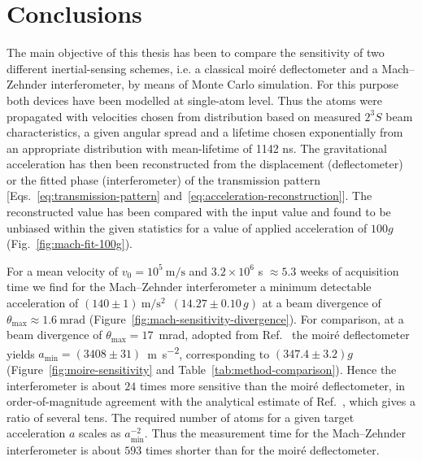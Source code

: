 \documentclass[12pt]{report}
\begin{document}
\chapter{Conclusions}
The main objective of this thesis has been to compare the sensitivity of two different inertial-sensing schemes, i.e. a classical moir\'e deflectometer and a Mach--Zehnder interferometer, by means of Monte Carlo simulation. For this purpose both devices have been modelled at single-atom level. Thus the atoms were propagated with velocities chosen from distribution based on measured $2^3S$ beam characteristics, a given angular spread and a lifetime chosen exponentially from an appropriate distribution with mean-lifetime of 1142 ns. 
The gravitational acceleration has then been reconstructed from the displacement (deflectometer) or the fitted phase (interferometer) of the transmission pattern [Eqs.~\eqref{eq:transmission-pattern} and~\eqref{eq:acceleration-reconstruction}]. The reconstructed value has been compared with the input value and found to be unbiased within the given statistics for a value of applied acceleration of $100g$ (Fig.~\ref{fig:mach-fit-100g}).

For a mean velocity of $v_0 = 10^5~\mathrm{m/s}$ and $3.2\times10^6$ s $\approx5.3$ weeks of acquisition time we find for the Mach--Zehnder interferometer a minimum detectable acceleration of $(140 \pm 1)~\mathrm{m/s^2}$ $\,(14.27 \pm 0.10\,g)$ at a beam divergence of $\theta_{\max} \approx 1.6~\mathrm{mrad}$ (Figure~\ref{fig:mach-sensitivity-divergence}). 
For comparison, at a beam divergence of \(\theta_{\max}=17\)~mrad, adopted from Ref.~\cite{Mariazzi_Caravita_Doser_Nebbia_Brusa_2020} the moir\'e deflectometer yields \(a_{\min}=(3408\pm31)\)~\si{\metre\per\second\squared}, corresponding to \((347.4\pm3.2)g\) (Figure~\ref{fig:moire-sensitivity} and Table~\ref{tab:method-comparison}).
Hence the interferometer is about $24$ times more sensitive than the moir\'e deflectometer, in order-of-magnitude agreement with the analytical estimate of Ref.~\cite{Mariazzi_Caravita_Doser_Nebbia_Brusa_2020}, which gives a ratio of several tens. The required number of atoms for a given target acceleration $a$ scales as $a_{\min}^{-2}$. Thus the measurement time for the Mach--Zehnder interferometer is about $593$ times shorter than for the moir\'e deflectometer.
\end{document}
